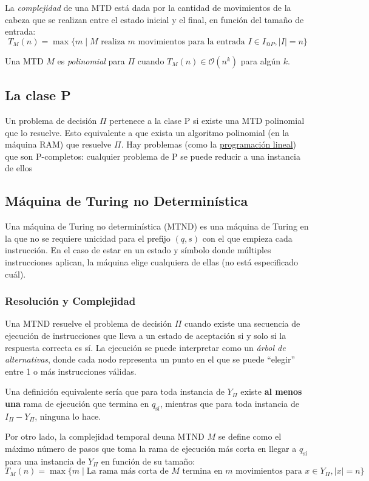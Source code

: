 \documentclass[a4paper]{report}
\newcommand{\BigO}[1]{\ensuremath{\mathcal{O}(#1)}}
\begin{document}
La \textit{complejidad} de una MTD está dada por la cantidad de movimientos de la cabeza que se realizan entre el estado inicial y el final, en función del tamaño de entrada:
$$T_M(n) = \max\{m \mid M \text{ realiza $m$ movimientos para la entrada $I \in I_{@P}, |I| = n$}\}$$

Una MTD $M$ es \textit{polinomial} para $\Pi$ cuando $T_M(n) \in \BigO{n^k}$ para algún $k$.

\subsection{La clase P}

Un problema de decisión $\Pi$ pertenece a la clase P si existe una MTD polinomial que lo resuelve. Esto equivalente a que exista un algoritmo polinomial (en la máquina RAM) que resuelve $\Pi$. Hay problemas (como la \hyperref[programacion-lineal]{programación lineal}) que son P-completos: cualquier problema de P se puede reducir a una instancia de ellos

\subsection{Máquina de Turing no Determinística}

Una máquina de Turing no determinística (MTND) es una máquina de Turing en la que no se requiere unicidad para el prefijo $(q, s)$ con el que empieza cada instrucción. En el caso de estar en un estado y símbolo donde múltiples instrucciones aplican, la máquina elige cualquiera de ellas (no está especificado cuál).

\subsubsection{Resolución y Complejidad}

Una MTND resuelve el problema de decisión $\Pi$ cuando existe una secuencia de ejecución de instrucciones que lleva a un estado de aceptación si y solo si la respuesta correcta es sí. La ejecución se puede interpretar como un \textit{árbol de alternativas}, donde cada nodo representa un punto en el que se puede ``elegir'' entre 1 o más instrucciones válidas.

Una definición equivalente sería que para toda instancia de $Y_{\Pi}$ existe \textbf{al menos una} rama de ejecución que termina en $q_{\text{sí}}$, mientras que para toda instancia de $I_{\Pi} - Y_{\Pi}$, ninguna lo hace.

Por otro lado, la complejidad temporal deuna MTND $M$ se define como el máximo número de pasos que toma la rama de ejecución más corta en llegar a $q_{\text{sí}}$ para una instancia de $Y_{\Pi}$ en función de su tamaño:
$$T_M(n) = \max\{m \mid \text{La rama más corta de $M$ termina en $m$ movimientos para $x \in Y_{\Pi}, |x| = n$}\}$$
\end{document}

